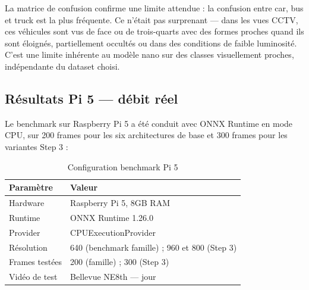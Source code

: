La matrice de confusion confirme une limite
attendue : la confusion entre car, bus et
truck est la plus fréquente. Ce n'était pas
surprenant — dans les vues CCTV, ces véhicules
sont vus de face ou de trois-quarts avec des
formes proches quand ils sont éloignés,
partiellement occultés ou dans des conditions
de faible luminosité. C'est une limite
inhérente au modèle nano sur des classes
visuellement proches, indépendante du
dataset choisi.

\subsection{Résultats Pi 5 — débit réel}

Le benchmark sur Raspberry Pi 5 a été
conduit avec ONNX Runtime en mode CPU,
sur 200 frames pour les six architectures
de base et 300 frames pour les variantes
Step 3 :

\begin{table}[H]
\centering
\caption{Configuration benchmark Pi 5}
\begin{tabularx}{\textwidth}{lX}
\toprule
\textbf{Paramètre} & \textbf{Valeur} \\
\midrule
Hardware & Raspberry Pi 5, 8GB RAM \\
Runtime  & ONNX Runtime 1.26.0 \\
Provider & CPUExecutionProvider \\
Résolution & 640 (benchmark famille) ;
960 et 800 (Step 3) \\
Frames testées & 200 (famille) ;
300 (Step 3) \\
Vidéo de test & Bellevue NE8th — jour \\
\bottomrule
\end{tabularx}
\label{tab:rpi5_config}
\end{table}

